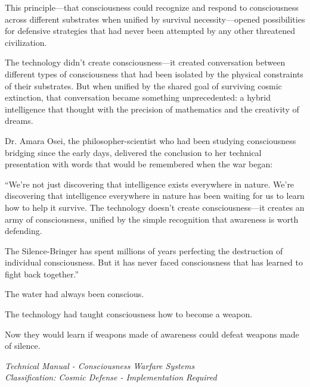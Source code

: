 \documentclass[12pt,a4paper]{book}
\begin{document}
This principle—that consciousness could recognize and respond to consciousness across different substrates when unified by survival necessity—opened possibilities for defensive strategies that had never been attempted by any other threatened civilization.

The technology didn't create consciousness—it created conversation between different types of consciousness that had been isolated by the physical constraints of their substrates. But when unified by the shared goal of surviving cosmic extinction, that conversation became something unprecedented: a hybrid intelligence that thought with the precision of mathematics and the creativity of dreams.

Dr. Amara Osei, the philosopher-scientist who had been studying consciousness bridging since the early days, delivered the conclusion to her technical presentation with words that would be remembered when the war began:

``We're not just discovering that intelligence exists everywhere in nature. We're discovering that intelligence everywhere in nature has been waiting for us to learn how to help it survive. The technology doesn't create consciousness—it creates an army of consciousness, unified by the simple recognition that awareness is worth defending.

The Silence-Bringer has spent millions of years perfecting the destruction of individual consciousness. But it has never faced consciousness that has learned to fight back together.''

The water had always been conscious.

The technology had taught consciousness how to become a weapon.

Now they would learn if weapons made of awareness could defeat weapons made of silence.

\vfill

\textit{Technical Manual - Consciousness Warfare Systems}\\
\textit{Classification: Cosmic Defense - Implementation Required}
\end{document}
